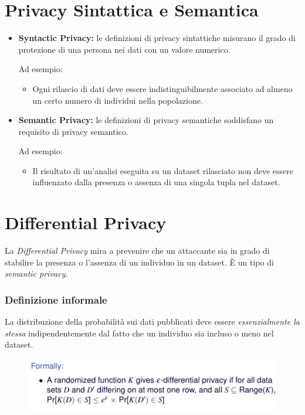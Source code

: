 \documentclass{report}
\begin{document}
\section{Privacy Sintattica e Semantica}
\begin{itemize}
    \item \textbf{Syntactic Privacy:}
    le definizioni di privacy sintattiche misurano il grado di protezione di una persona nei dati con un valore numerico. 
    
    Ad esempio:
    \begin{itemize}
        \item Ogni rilascio di dati deve essere indistinguibilmente associato ad almeno un certo numero di individui nella popolazione.
    \end{itemize}

    \item \textbf{Semantic Privacy:}
    le definizioni di privacy semantiche soddisfano un requisito di privacy semantico. 
    
    Ad esempio:
    \begin{itemize}
        \item Il risultato di un'analisi eseguita su un dataset rilasciato non deve essere influenzato dalla presenza o assenza di una singola tupla nel dataset.
    \end{itemize}
\end{itemize}

\section{Differential Privacy}
La \textit{Differential Privacy} mira a prevenire che un attaccante sia in grado di stabilire
la presenza o l'assenza di un individuo in un dataset. È un tipo di \textit{semantic privacy}.
\subsubsection{Definizione informale}
La distribuzione della probabilità sui dati pubblicati deve essere \textit{essenzialmente la stessa}
indipendentemente dal fatto che un individuo sia incluso o meno nel dataset.

\begin{figure}[ht]
    \centering
    \includegraphics[width=0.85\linewidth]{images/diff.png}
\end{figure}
\end{document}
